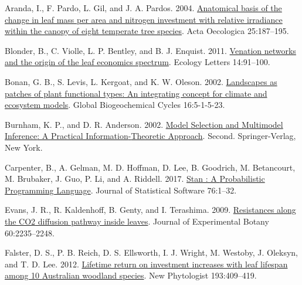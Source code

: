 \documentclass[
  12pt,
]{article}
\newlength{\cslhangindent} %
\newlength{\cslentryspacingunit} %
\newenvironment{CSLReferences}[2] %
 {%
  \setlength{\parindent}{0pt} %
  \ifodd #1 %
  \let\oldpar\par %
  \def\par{\hangindent=\cslhangindent\oldpar} %
  \fi %
  \setlength{\parskip}{#2\cslentryspacingunit} %
 }%
 {} %
\providecommand{\DIFaddbegin}{} %
\providecommand{\DIFaddend}{} %
\providecommand{\DIFdelbegin}{} %
\providecommand{\DIFdelend}{} %
\newcommand{\DIFscaledelfig}{0.5}
\newlength{\DIFdelgraphicswidth} %
\newlength{\DIFdelgraphicsheight} %
\newcommand{\DIFaddincludegraphics}[2][]{{\color{blue}\fbox{\DIFOincludegraphics[#1]{#2}}}} %
\newcommand{\DIFdelincludegraphics}[2][]{%
\sbox{\DIFdelgraphicsbox}{\DIFOincludegraphics[#1]{#2}}%
\settoboxwidth{\DIFdelgraphicswidth}{\DIFdelgraphicsbox} %
\settoboxtotalheight{\DIFdelgraphicsheight}{\DIFdelgraphicsbox} %
\scalebox{\DIFscaledelfig}{%
\parbox[b]{\DIFdelgraphicswidth}{\usebox{\DIFdelgraphicsbox}\\[-\baselineskip] \rule{\DIFdelgraphicswidth}{0em}}\llap{\resizebox{\DIFdelgraphicswidth}{\DIFdelgraphicsheight}{%
\setlength{\unitlength}{\DIFdelgraphicswidth}%
\begin{picture}(1,1)%
\thicklines\linethickness{2pt} %
{\color[rgb]{1,0,0}\put(0,0){\framebox(1,1){}}}%
{\color[rgb]{1,0,0}\put(0,0){\line( 1,1){1}}}%
{\color[rgb]{1,0,0}\put(0,1){\line(1,-1){1}}}%
\end{picture}%
}\hspace*{3pt}}} %
} %
\DeclareRobustCommand{\DIFaddbegin}{\DIFOaddbegin \let\includegraphics\DIFaddincludegraphics} %
\DeclareRobustCommand{\DIFaddend}{\DIFOaddend \let\includegraphics\DIFOincludegraphics} %
\DeclareRobustCommand{\DIFdelbegin}{\DIFOdelbegin \let\includegraphics\DIFdelincludegraphics} %
\DeclareRobustCommand{\DIFdelend}{\DIFOaddend \let\includegraphics\DIFOincludegraphics} %
\begin{document}
\hypertarget{refs}{}
\begin{CSLReferences}{1}{0}
\leavevmode{}%
Aranda, I., F. Pardo, L. Gil, and J. A. Pardos. 2004. \href{https://doi.org/10.1016/j.actao.2004.01.003}{Anatomical basis of the change in leaf mass per area and nitrogen investment with relative irradiance within the canopy of eight temperate tree species}. Acta Oecologica 25:187--195.

\leavevmode{}%
Blonder, B., C. Violle, L. P. Bentley, and B. J. Enquist. 2011. \href{https://doi.org/10.1111/j.1461-0248.2010.01554.x}{Venation networks and the origin of the leaf economics spectrum}. Ecology Letters 14:91--100.

\leavevmode{}%
Bonan, G. B., S. Levis, L. Kergoat, and K. W. Oleson. 2002. \href{https://doi.org/10.1029/2000GB001360}{Landscapes as patches of plant functional types: \DIFdelbegin %
\DIFdelend An \DIFdelbegin %
\DIFdelend integrating concept for climate and ecosystem models}. Global Biogeochemical Cycles 16:5-1-5-23.

\leavevmode{}%
Burnham, K. P., and D. R. Anderson. 2002. \href{https://doi.org/10.1007/b97636}{Model {Selection} and {Multimodel Inference}: \DIFdelbegin %
\DIFdelend A \DIFaddbegin {\DIFaddend Practical Information}-{Theoretic Approach}}. Second. {Springer-Verlag}, {New York}.

\leavevmode{}%
Carpenter, B., A. Gelman, M. D. Hoffman, D. Lee, B. Goodrich, M. Betancourt, M. Brubaker, J. Guo, P. Li, and A. Riddell. 2017. \href{https://doi.org/10.18637/jss.v076.i01}{Stan : \DIFdelbegin %
\DIFdelend A \DIFaddbegin {\DIFaddend Probabilistic Programming Language}}. Journal of Statistical Software 76:1--32.

\leavevmode{}%
Evans, J. R., R. Kaldenhoff, B. Genty, and I. Terashima. 2009. \href{https://doi.org/10.1093/jxb/erp117}{Resistances along the {CO2} diffusion pathway inside leaves}. Journal of Experimental Botany 60:2235--2248.

\leavevmode{}%
Falster, D. S., P. B. Reich, D. S. Ellsworth, I. J. Wright, M. Westoby, J. Oleksyn, and T. D. Lee. 2012. \href{https://doi.org/10.1111/j.1469-8137.2011.03940.x}{Lifetime return on investment increases with leaf lifespan among 10 {Australian} woodland species}. New Phytologist 193:409--419.


\end{CSLReferences}
\end{document}

